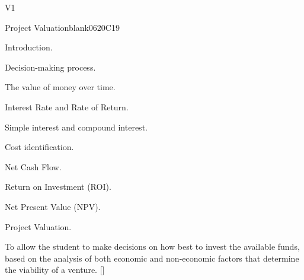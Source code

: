 \begin{syllabus}
\begin{competences}{V1}
    \item {} 
    \item {}
    \item {}
    \item {}
    \item {}
    \item {}
    \item {}
    \item {}
\end{competences}

\begin{unit}{}{Project Valuation}{blank06}{20}{C19}
\begin{topics}
      \item Introduction.
       \item Decision-making process.
       \item The value of money over time.
       \item Interest Rate and Rate of Return.
       \item Simple interest and compound interest.
       \item Cost identification.
       \item Net Cash Flow.
       \item Return on Investment (ROI).
      \item Net Present Value (NPV).
       \item Project Valuation.
   \end{topics}
   \begin{learningoutcomes}
      \item To allow the student to make decisions on how best to invest the available funds, based on the analysis of both economic and non-economic factors that determine the viability of a venture. [\Assessment]
   \end{learningoutcomes}
\end{unit}


\end{syllabus}

